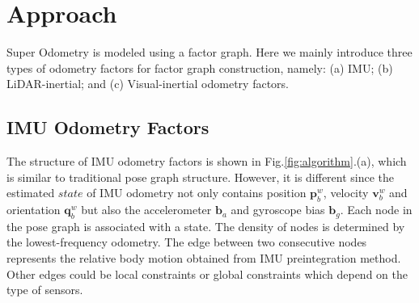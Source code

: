 \section{Approach}
\label{sec:mrmr-approach}
Super Odometry is modeled using a factor graph. Here we mainly introduce three types of odometry factors for factor graph construction, namely: (a) IMU; (b) LiDAR-inertial; and (c) Visual-inertial odometry factors. 

\subsection{IMU Odometry Factors}
The structure of IMU odometry factors is shown in Fig.\ref{fig:algorithm}.({a}), which is similar to traditional pose graph structure. However, it is different since the estimated $state$ of IMU odometry not only contains position $\mathbf{p}_{b}^{w}$, velocity $\mathbf{v}_{b}^{w}$ and orientation 
$\mathbf{q}_{b}^{w}$ but also the accelerometer $\mathbf{b}_{a}$ and gyroscope bias $\mathbf{b}_{g}$. Each node in the pose graph is associated with a state. 
The density of nodes is determined by the lowest-frequency odometry. The edge between two consecutive nodes represents the relative body motion obtained from 
IMU preintegration method. Other edges could be local constraints or global constraints which depend on the type of sensors. 

